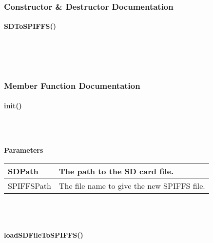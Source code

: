     \subsubsection{Constructor \& Destructor Documentation}\mbox{}


        \paragraph{SDToSPIFFS()}\mbox{}\\

            \\

            \\


    \subsubsection{Member Function Documentation}\mbox{}


        \paragraph{init()}\mbox{}\\

            \\


            \textbf{Parameters}

            \vspace{1em}
            \begin{tabular}{| l | l |} 
                \hline
                SDPath & The path to the SD card file. \\ 
                \hline
                SPIFFSPath & The file name to give the new SPIFFS file. \\ 
                \hline
            \end{tabular}\\~\\


        \paragraph{loadSDFileToSPIFFS()}\mbox{}\\

